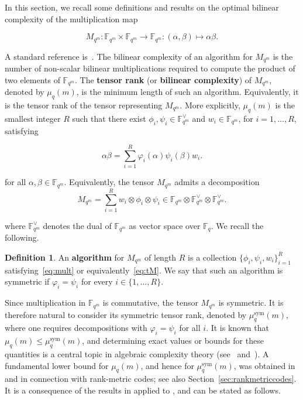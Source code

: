 \documentclass[11pt,a4paper,reqno]{article}
\numberwithin{equation}{section}
\theoremstyle{definition}
\newtheorem{definition}[theorem]{Definition}
\newcommand{\numberset}{\mathbb}
\newcommand{\F}{\numberset{F}}
\newcommand{\Fq}{\F_q}
\newcommand{\fqm}{\F_{q^m}}
\begin{document}
In this section, we recall some definitions and results on the optimal bilinear complexity of the multiplication map 

\begin{equation*}
M_{q^m}:\fqm\times \fqm\rightarrow\fqm:(\alpha,\beta)\mapsto\alpha\beta.
\end{equation*}

A standard reference is~\cite{ballet2021tensor}. The bilinear complexity of an algorithm for \(M_{q^m}\) is the number of
non-scalar bilinear multiplications required to compute the product of two
elements of \(\mathbb F_{q^m}\). The \textbf{tensor rank}  (or \textbf{bilinear complexity}) of
\(M_{q^m}\), denoted by \(\mu_q(m)\), is the minimum length of such an algorithm.
Equivalently, it is the tensor rank of the tensor representing \(M_{q^m}\).  More explicitly, \(\mu_q(m)\) is the smallest integer \(R\) such that there exist
\(\phi_i,\psi_i\in \mathbb F_{q^m}^{\vee}\) and
\(w_i\in\mathbb F_{q^m}\), for \(i=1,\ldots,R\), satisfying

\begin{equation}
\label{eq:mult}
    \alpha\beta=\sum_{i=1}^R \varphi_i(\alpha)\psi_i(\beta)w_i.
\end{equation}

for all \(\alpha,\beta\in\mathbb F_{q^m}\). Equivalently, the tensor \(M_{q^m}\) admits a decomposition
\begin{equation}
\label{eq:tM}
    M_{q^m}
=
\sum_{i=1}^R w_i\otimes \phi_i\otimes \psi_i
\in
\mathbb F_{q^m}\otimes \mathbb F_{q^m}^{\vee}\otimes \mathbb F_{q^m}^{\vee}.
\end{equation}

where $\fqm^\vee$ denotes the dual of $\fqm$ as vector space over $\Fq$. We recall the following. 

\begin{definition}
    An \textbf{algorithm} for $M_{q^m}$ of length $R$ is a collection $\{\phi_i,\psi_i,w_i\}_{i=1}^R$ satisfying~\eqref{eq:mult} or equivalently~\eqref{eq:tM}. We say that such an algorithm is symmetric if \(\varphi_i=\psi_i\) for every \(i\in\{1,\ldots,R\}\).
\end{definition}

Since multiplication in \(\mathbb F_{q^m}\) is commutative, the tensor
\(M_{q^m}\) is symmetric. It is therefore natural to
consider its symmetric tensor rank, denoted by
\(\mu_q^{\mathrm{sym}}(m)\), where one requires decompositions with
\(\varphi_i=\psi_i\) for all \(i\). It is known that $\mu_q(m) \le \mu_q^{\mathrm{sym}}(m)$, and determining exact values or bounds for these quantities is a central topic in algebraic complexity theory (see~\cite{burgisser2013algebraic} and~\cite{ballet2021tensor}). A fundamental lower bound for \(\mu_q(m)\), and hence for
\(\mu_q^{\mathrm{sym}}(m)\), was obtained in
\cite[Theorem~2.2]{ballet2021tensor} and
\cite[Proposition~5.12]{byrne2019tensor} in connection with rank-metric
codes; see also Section~\ref{sec:rankmetriccodes}. It is a consequence of the
results in \cite{de1983characterization} applied to
\cite[Proposition~14.47]{burgisser2013algebraic}, and can be stated as follows.
\end{document}
